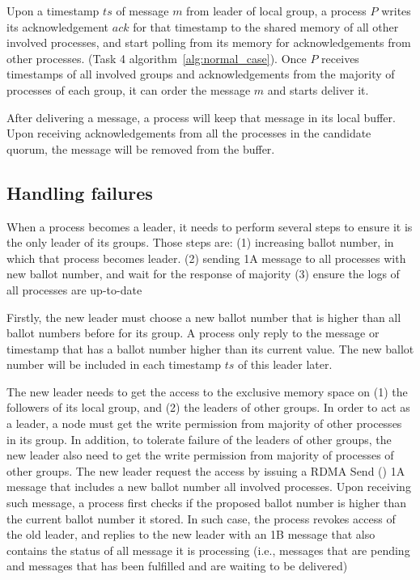 Upon \lread a timestamp $ts$ of message $m$ from leader of local group, a
process $P$ writes its acknowledgement $ack$ for that timestamp to the shared
memory of all other involved processes, and start polling from its memory for
acknowledgements from other processes. (Task 4 algorithm~\ref{alg:normal_case}).
Once $P$ receives timestamps of all involved groups and acknowledgements from
the majority of processes of each group, it can order the message $m$ and starts
deliver it.

After delivering a message, a process will keep that message in its local buffer.
Upon receiving acknowledgements from all the processes in the candidate
quorum, the message will be removed from the buffer.

\subsection{Handling failures}
\label{sec:failurecase}

%

When a process becomes a leader, it needs to perform
several steps to ensure it is the only leader of its groups. Those steps are:
(1) increasing ballot number, in which that process becomes leader. (2) sending
1A message to all processes with new ballot number, and wait for the response of
majority (3) ensure the logs of all processes are up-to-date

Firstly, the new leader must choose a new ballot number that is higher than all
ballot numbers before for its group. A process only reply to the message or
timestamp that has a ballot number higher than its current value. The new ballot
number will be included in each timestamp $ts$ of this leader later.

The new leader needs to get the access to the exclusive memory space on (1) the
followers of its local group, and (2) the leaders of other groups. In order to
act as a leader, a node must get the write permission from majority of other
processes in its group. In addition, to tolerate failure of the leaders of other
groups, the new leader also need to get the write permission from majority of
processes of other groups. The new leader request the access by issuing a RDMA
Send () 1A message that includes a new ballot
number all involved processes. Upon receiving such message, a process first
checks if the proposed ballot number is higher than the current ballot number it
stored. In such case, the process revokes access of the old leader, and replies
to the new leader with an 1B message that also contains the status of all
message it is processing (i.e., messages that are pending and messages that has
been fulfilled and are waiting to be delivered)

